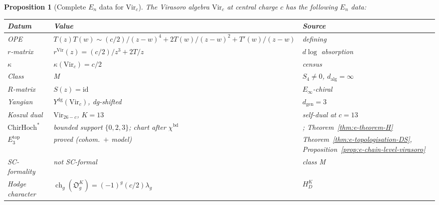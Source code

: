\documentclass[11pt,reqno]{amsart}
\newtheorem{proposition}[theorem]{Proposition}
\theoremstyle{definition}
\theoremstyle{remark}
\providecommand{\Ethree}{E_3}
\providecommand{\En}{E_n}
\providecommand{\Einf}{E_\infty}
\providecommand{\ChirHoch}{\mathrm{ChirHoch}}
\providecommand{\id}{\mathrm{id}}
\begin{document}
\begin{proposition}[Complete $\En$ data for $\mathrm{Vir}_c$]
\label{prop:e-vir-complete}
The Virasoro algebra $\mathrm{Vir}_c$ at central charge $c$
has the following $\En$ data:
\begin{center}
\renewcommand{\arraystretch}{1.15}
\begin{tabular}{lll}
\textbf{Datum} & \textbf{Value} & \textbf{Source} \\
\hline
\textup{OPE} &
 $T(z)T(w) \sim (c/2)/(z-w)^4 + 2T(w)/(z-w)^2 + T'(w)/(z-w)$
 & defining \\
\textup{$r$-matrix} &
 $r^{\mathrm{Vir}}(z) = (c/2)/z^3 + 2T/z$ &
 $d\log$ absorption \\
\textup{$\kappa$} &
 $\kappa(\mathrm{Vir}_c) = c/2$ &
 census \\
\textup{Class} & M &
 $S_4 \neq 0$, $d_{\mathrm{alg}} = \infty$ \\
\textup{$R$-matrix} & $S(z) = \id$ &
 $\Einf$-chiral \\
\textup{Yangian} &
 $Y^{\mathrm{dg}}(\mathrm{Vir}_c)$, dg-shifted &
 $d_{\mathrm{gen}} = 3$ \\
\textup{Koszul dual} &
 $\mathrm{Vir}_{26-c}$, $K = 13$ &
 self-dual at $c = 13$ \\
\textup{$\ChirHoch^*$} &
 bounded support $\{0,2,3\}$; chart after $\chi^{\mathrm{bd}}$ &
 \cite[Theorem~7.2]{BDSK21}; Theorem~\ref{thm:e-theorem-H} \\
\textup{$\Ethree^{\mathrm{top}}$} &
 proved \textup{(}cohom.\ $+$ model\textup{)} &
 Theorem~\ref{thm:e-topologisation-DS},
 Proposition~\ref{prop:e-chain-level-virasoro} \\
\textup{SC-formality} & not SC-formal & class M \\
\textup{Hodge character} &
 $\operatorname{ch}_g(\mathfrak O_g^K)=(-1)^g(c/2)\lambda_g$
 & $H_D^K$
\end{tabular}
\end{center}
\end{proposition}
\end{document}
